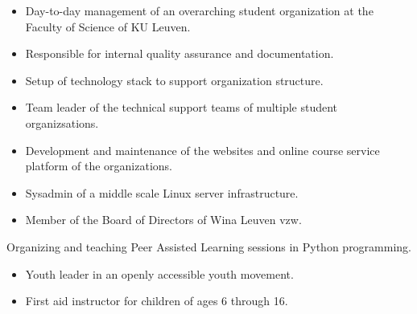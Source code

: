 \documentclass[10pt,a4paper,ragged2e]{altacv}
\begin{document}
\divider


\divider



\begin{itemize}
	\item Day-to-day management of an overarching student organization at the Faculty of Science of KU Leuven.
	\item Responsible for internal quality assurance and documentation.
	\item Setup of technology stack to support organization structure.
\end{itemize}

\divider


\begin{itemize}
	\item Team leader of the technical support teams of multiple student organizsations.
	\item Development and maintenance of the websites and online course service platform of the organizations.
	\item Sysadmin of a middle scale Linux server infrastructure.
	\item Member of the Board of Directors of Wina Leuven vzw.
\end{itemize}

\divider


\small Organizing and teaching Peer Assisted Learning sessions in Python programming.

\divider

\begin{itemize}
	\item Youth leader in an openly accessible youth movement.
	\item First aid instructor for children of ages 6 through 16.
\end{itemize}
\end{document}
